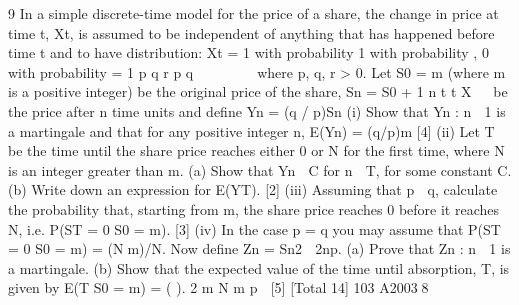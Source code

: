 
9 In a simple discrete-time model for the price of a share, the change in price at time t,
Xt, is assumed to be independent of anything that has happened before time t and to
have distribution:
Xt =
1 with probability
1 with probability ,
0 with probability = 1
p
q
r p q

 
  
where p, q, r > 0.
Let S0 = m (where m is a positive integer) be the original price of the share,
Sn = S0 + 1
n
t t X
  be the price after n time units and define
Yn = (q / p)Sn
(i)  Show that {Yn : n  1} is a martingale and that for any positive integer n,
E(Yn) = (q/p)m [4]
(ii)  Let T be the time until the share price reaches either 0 or N for the first time,
where N is an integer greater than m.
(a) Show that 
Yn
  C for n  T, for some constant C.
(b) Write down an expression for E(YT).
[2]
(iii) Assuming that p  q, calculate the probability that, starting from m, the share
price reaches 0 before it reaches N, i.e. P(ST = 0 
S0 = m). [3]
(iv) In the case p = q you may assume that P(ST = 0 
S0 = m) = (Nm)/N. Now
define Zn = Sn2  2np.
(a) Prove that {Zn : n  1} is a martingale.
(b) Show that the expected value of the time until absorption, T, is given
by
E(T
S0 = m) = ( ).
2
m N m
p

[5]
[Total 14]
103 A20038

